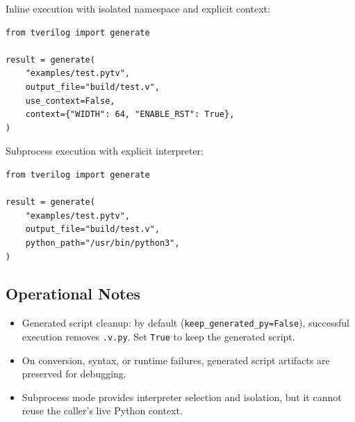 Inline execution with isolated namespace and explicit context:
\begin{verbatim}
from tverilog import generate

result = generate(
    "examples/test.pytv",
    output_file="build/test.v",
    use_context=False,
    context={"WIDTH": 64, "ENABLE_RST": True},
)
\end{verbatim}

Subprocess execution with explicit interpreter:
\begin{verbatim}
from tverilog import generate

result = generate(
    "examples/test.pytv",
    output_file="build/test.v",
    python_path="/usr/bin/python3",
)
\end{verbatim}

\subsection{Operational Notes}
\begin{itemize}
  \item Generated script cleanup: by default (\texttt{keep\_generated\_py=False}),
  successful execution removes \texttt{.v.py}. Set \texttt{True} to keep the generated script.
  \item On conversion, syntax, or runtime failures, generated script artifacts are preserved for debugging.
  \item Subprocess mode provides interpreter selection and isolation, but it cannot reuse the caller's live Python context.
\end{itemize}
